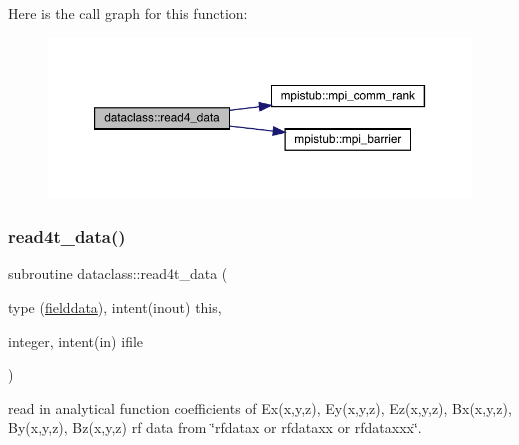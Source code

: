 Here is the call graph for this function\+:\nopagebreak
\begin{figure}[H]
\begin{center}
\leavevmode
\includegraphics[width=350pt]{namespacedataclass_a2ef1f00ff4295094270a70c5d3763019_cgraph}
\end{center}
\end{figure}
\mbox{\label{namespacedataclass_a8159006c3a211e35e4c3e22d94b2abc6}} 
\subsubsection{\texorpdfstring{read4t\_data()}{read4t\_data()}}
{\footnotesize\ttfamily subroutine dataclass\+::read4t\+\_\+data (\begin{DoxyParamCaption}\item[{type (\mbox{\hyperlink{namespacedataclass_structdataclass_1_1fielddata}{fielddata}}), intent(inout)}]{this,  }\item[{integer, intent(in)}]{ifile }\end{DoxyParamCaption})}



read in analytical function coefficients of Ex(x,y,z), Ey(x,y,z), Ez(x,y,z), Bx(x,y,z), By(x,y,z), Bz(x,y,z) rf data from \char`\"{}rfdatax or rfdataxx or rfdataxxx\char`\"{}. 

